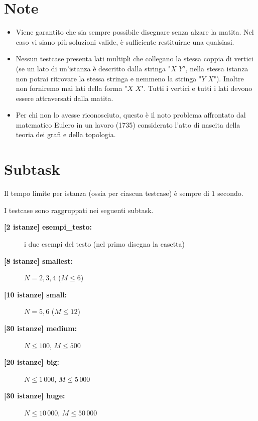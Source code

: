 \documentclass[a4paper,11pt]{article}
\begin{document}
\section*{Note}
\begin{itemize}
  
    \item 
Viene garantito che sia sempre possibile disegnare senza alzare la matita. Nel caso vi siano più soluzioni valide, è sufficiente restituirne una qualsiasi.

    \item 
Nessun testcase presenta lati multipli che collegano la stessa coppia di vertici (se un lato di un'istanza è descritto dalla stringa "$X$ $Y$", nella stessa istanza non potrai ritrovare la stessa stringa e nemmeno la stringa "$Y$ $X$"). Inoltre non forniremo mai lati della forma "$X$ $X$". Tutti i vertici e tutti i lati devono essere attraversati dalla matita.

    \item 
    Per chi non lo avesse riconosciuto, questo è il noto problema affrontato dal matematico Eulero in un lavoro (1735) considerato l'atto di nascita della teoria dei grafi e della topologia.

\end{itemize}

\section*{Subtask}

Il tempo limite per istanza (ossia per ciascun testcase) è sempre di $1$ secondo.

I testcase sono raggruppati nei seguenti subtask.

\begin{description}
  \item[\textbf{\hspace{1ex}[2 istanze] esempi\_testo:}] i due esempi del testo (nel primo disegna la casetta)
  \item [\textbf{[8 istanze] smallest:}] $N = 2, 3, 4$ ($M \leq 6$)
  \item [\textbf{[10 istanze] small:}] $N = 5, 6$ ($M \leq 12$)
  \item [\textbf{[30 istanze] medium:}] $N \leq 100$, $M \leq 500$
  \item [\textbf{[20 istanze] big:}] $N \leq 1\,000$, $M \leq 5\,000$
  \item [\textbf{[30 istanze] huge:}] $N \leq 10\,000$, $M \leq 50\,000$
\end{description}
\end{document}
